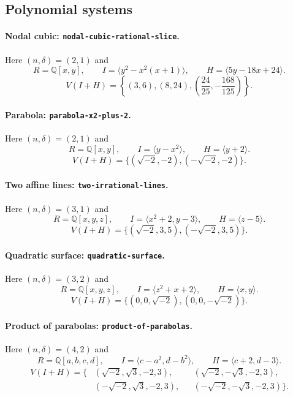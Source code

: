 \documentclass{weeklyprogress}
\begin{document}
\subsection{Polynomial systems}

\paragraph{Nodal cubic: \texttt{nodal-cubic-rational-slice}.}
Here $(n,\delta)=(2,1)$ and
\[
 R=\mathbb{Q}[x,y],\qquad
 I=\langle y^2-x^2(x+1)\rangle,\qquad
 H=\langle 5y-18x+24\rangle.
\]
\[
 V(I+H)=
 \left\{(3,6),(8,24),
 \left(\frac{24}{25},-\frac{168}{125}\right)\right\}.
\]

\paragraph{Parabola: \texttt{parabola-x2-plus-2}.}
Here $(n,\delta)=(2,1)$ and
\[
 R=\mathbb{Q}[x,y],\qquad
 I=\langle y-x^2\rangle,\qquad
 H=\langle y+2\rangle.
\]
\[
 V(I+H)=\{(\sqrt{-2},-2),(-\sqrt{-2},-2)\}.
\]

\paragraph{Two affine lines: \texttt{two-irrational-lines}.}
Here $(n,\delta)=(3,1)$ and
\[
 R=\mathbb{Q}[x,y,z],\qquad
 I=\langle x^2+2,y-3\rangle,\qquad
 H=\langle z-5\rangle.
\]
\[
 V(I+H)=\{(\sqrt{-2},3,5),(-\sqrt{-2},3,5)\}.
\]

\paragraph{Quadratic surface: \texttt{quadratic-surface}.}
Here $(n,\delta)=(3,2)$ and
\[
 R=\mathbb{Q}[x,y,z],\qquad
 I=\langle z^2+x+2\rangle,\qquad
 H=\langle x,y\rangle.
\]
\[
 V(I+H)=\{(0,0,\sqrt{-2}),(0,0,-\sqrt{-2})\}.
\]

\paragraph{Product of parabolas: \texttt{product-of-parabolas}.}
Here $(n,\delta)=(4,2)$ and
\[
 R=\mathbb{Q}[a,b,c,d],\qquad
 I=\langle c-a^2,d-b^2\rangle,\qquad
 H=\langle c+2,d-3\rangle.
\]
\[
 \begin{aligned}
 V(I+H)=\{&
 (\sqrt{-2},\sqrt{3},-2,3),
 &&(\sqrt{-2},-\sqrt{3},-2,3),\\
 &(-\sqrt{-2},\sqrt{3},-2,3),
 &&(-\sqrt{-2},-\sqrt{3},-2,3)\}.
 \end{aligned}
\]
\end{document}
